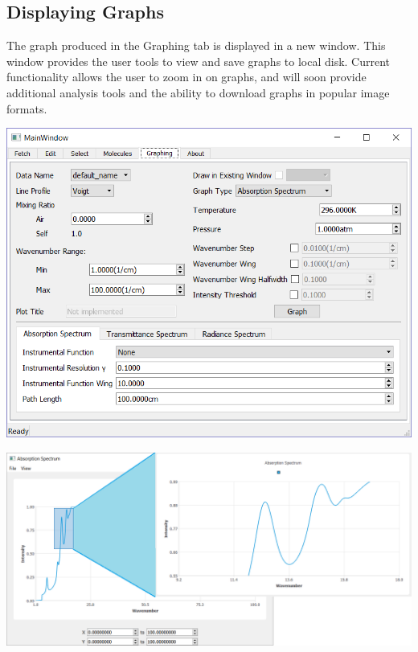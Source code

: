 \documentclass[a0,landscape]{a0poster}
\begin{document}
\begin{multicols}{3}
\subsection*{Displaying Graphs}
The graph produced in the Graphing tab is displayed in a new window. This window provides the user tools to view and save graphs to local disk. Current functionality allows the user to zoom in on graphs, and will soon provide additional analysis tools and the ability to download graphs in popular image formats. 
\begin{center}
\includegraphics[scale = 1.5]{MainWindow_Graphing.png}
\end{center}
\begin{center}
\includegraphics[scale = 1.2]{GraphDisplayWindow_ZoomDemo.png}
\end{center}


\end{multicols}
\end{document}
